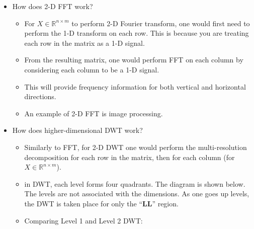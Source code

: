 \documentclass[11.5pt,a4paper]{article}
\begin{document}
\begin{itemize}
    \item How does 2-D FFT work?
    \begin{itemize}
        \item For $X \in \mathbb{R}^{n\times m}$ to perform 2-D Fourier transform, one would first need to perform the 1-D transform on each row. This is because you are treating each row in the matrix as a 1-D signal.
        \item From the resulting matrix, one would perform FFT on each column by considering each column to be a 1-D signal.
        \item This will provide frequency information for both vertical and horizontal directions.
        \item An example of 2-D FFT is image processing.
    \end{itemize}
    \item How does higher-dimensional DWT work?
    \begin{itemize}
        \item Similarly to FFT, for 2-D DWT one would perform the multi-resolution decomposition for each row in the matrix, then for each column (for $X \in \mathbb{R}^{n\times m}$).
        \item in DWT, each level forms four quadrants. The diagram is shown below. The levels are not associated with the dimensions. As one goes up levels, the DWT is taken place for only the ``\textbf{LL}'' region.
        \begin{center}
        \end{center}
        \item Comparing Level 1 and Level 2 DWT:
        \begin{center}
            \begin{tikzpicture}[scale=1.2]
            

\end{tikzpicture}
\end{center}
\end{itemize}
\end{itemize}
\end{document}
